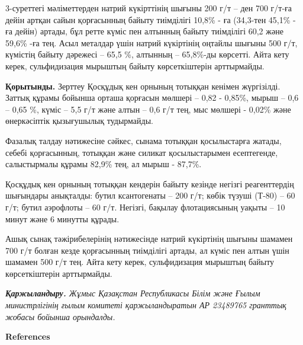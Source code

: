 \begin{multicols}{2}
3-суреттегі мәліметтерден натрий күкірттінің шығыны 200 г/т -- ден 700
г/т-ға дейін артқан сайын қорғасынның байыту тиімділігі 10,8\% - ға
(34,3-тен 45,1\% - ға дейін) артады, бұл ретте күміс пен алтынның байыту
тиімділігі 60,2 және 59,6\% -ға тең. Асыл металдар үшін натрий
күкіртінің оңтайлы шығыны 500 г/т, күмістің байыту дәрежесі -- 65,5 \%,
алтынның -- 65,8\%-ды көрсетті. Айта кету керек, сульфидизация мырыштың
байыту көрсеткіштерін арттырмайды.

{\bfseries Қорытынды.} Зерттеу Қосқұдық кен орнының тотыққан кенімен
жүргізілді. Заттық құрамы бойынша орташа қорғасын мөлшері -- 0,82 -
0,85\%, мырыш -- 0,6 -- 0,65 \%, күміс -- 5,5 г/т және алтын -- 0,6 г/т
тең, мыс мөлшері - 0,02\% және өнеркәсіптік қызығушылық тудырмайды.

Фазалық талдау нәтижесіне сәйкес, сынама тотыққан қосылыстарға жатады,
себебі қорғасынның, тотыққан және силикат қосылыстарымен есептегенде,
салыстырмалы құрамы 82,9\% тең, ал мырыш - 87,7\%.

Қосқұдық кен орнының тотыққан кендерін байыту кезінде негізгі
реагенттердің шығындары анықталды: бутил ксантогенаты -- 200 г/т; көбік
түзуші (Т-80) -- 60 г/т; бутил аэрофлоты -- 60 г/т. Негізгі, бақылау
флотациясының уақыты -- 10 минут және 6 минутты құрады.

Ашық сынақ тәжірибелерінің нәтижесінде натрий күкіртінің шығыны шамамен
700 г/т болған кезде қорғасынның тиімділігі артады, ал күміс пен алтын
үшін шамамен 500 г/т тең. Айта кету керек, сульфидизация мырыштың байыту
көрсеткіштерін арттырмайды.

\emph{{\bfseries Қаржыландыру.} Жұмыс Қазақстан Республикасы Білім және
Ғылым министрлігінің ғылым комитеті қаржыландыратын АР 23489765 гранттық
жобасы бойынша орындалды.}
\end{multicols}

\begin{center}
{\bfseries References}
\end{center}

